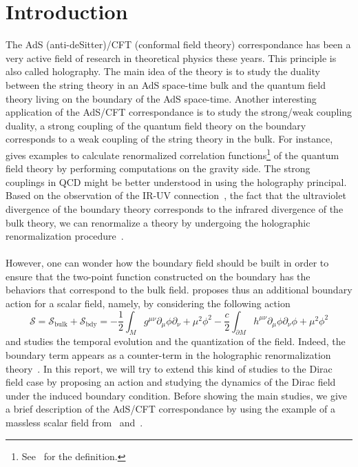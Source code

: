 \section{Introduction}
The AdS (anti-deSitter)/CFT (conformal field theory) correspondance has been a very active field of research in theoretical physics these years. 
This principle is also called holography.
The main idea of the theory is to study the duality between the string theory in an AdS space-time bulk and the quantum field theory living on the boundary of the AdS space-time.
Another interesting application of the AdS/CFT correspondance is to study the strong/weak coupling duality, \ie
a strong coupling of the quantum field theory on the boundary corresponds to a weak coupling of the string theory in the bulk.
For instance,~\cite{Skenderis2002} gives examples to calculate renormalized correlation functions\footnote{
See~\eg\cite{Peskin1995} for the definition.
} of the quantum field theory by performing computations on the gravity side.
The strong couplings in QCD might be better understood in using the holography principal. 
Based on the observation of the IR-UV connection~\cite{Susskind1998}, 
\ie the fact that the ultraviolet divergence of the boundary theory corresponds to the infrared divergence of the bulk theory, 
we can renormalize a theory by undergoing the holographic renormalization procedure~\cite{Skenderis2002}. \\\\
%
However, one can wonder how the boundary field should be built in order to ensure that the two-point function constructed on the boundary has the behaviors that correspond to the bulk field. 
\cite{Zahn2016} proposes thus an additional boundary action for a scalar field, namely, by considering the following action
\begin{equation*}
\mathcal{S} = \mathcal{S}_{\mathrm{bulk}} + \mathcal{S}_{\mathrm{bdy}} = 
-\frac 1 2 \int_M g^{\mu\nu} \partial_\mu \phi \partial_{\nu} + 
\mu^2\phi^2 - \frac c 2 \int_{\partial M}h^{\mu\nu}\partial_\mu\phi\partial_\nu\phi + \mu^2\phi^2
\end{equation*}
and studies the temporal evolution and the quantization of the field.
Indeed, the boundary term appears as a counter-term in the holographic renormalization theory~\cite{Skenderis2002}.
In this report, we will try to extend this kind of studies to the Dirac field case by proposing an action and studying the dynamics of the Dirac field under the induced boundary condition.
Before showing the main studies, 
we give a brief description of the AdS/CFT correspondance by using the example of a massless scalar field from~\cite{Witten1998} and~\cite{Skenderis2002}. 
%
